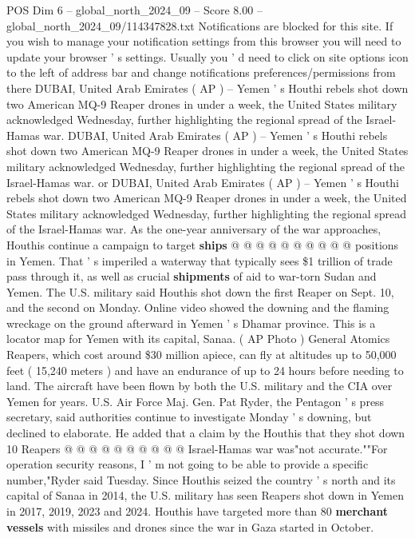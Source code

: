\begin{textsample}{POS Dim 6 – global\_north\_2024\_09 – Score 8.00 – global\_north\_2024\_09/114347828.txt}  \label{ex:f6_pos_362}
Notifications are blocked for this site.
If you wish to manage your notification settings from this browser you will need to update your browser ' s settings.
Usually you ' d need to click on site options icon to the left of address bar and change notifications preferences/permissions from there DUBAI, United Arab Emirates ( AP ) -- Yemen ' s Houthi rebels shot down two American MQ-9 Reaper drones in under a week, the United States military acknowledged Wednesday, further highlighting the regional spread of the Israel-Hamas war.
DUBAI, United Arab Emirates ( AP ) -- Yemen ' s Houthi rebels shot down two American MQ-9 Reaper drones in under a week, the United States military acknowledged Wednesday, further highlighting the regional spread of the Israel-Hamas war. or DUBAI, United Arab Emirates ( AP ) -- Yemen ' s Houthi rebels shot down two American MQ-9 Reaper drones in under a week, the United States military acknowledged Wednesday, further highlighting the regional spread of the Israel-Hamas war.
As the one-year anniversary of the war approaches, Houthis continue a campaign to target \textbf{ships} @ @ @ @ @ @ @ @ @ @ positions in Yemen.
That ' s imperiled a waterway that typically sees \$1 trillion of trade pass through it, as well as crucial \textbf{shipments} of aid to war-torn Sudan and Yemen.
The U.S. military said Houthis shot down the first Reaper on Sept. 10, and the second on Monday.
Online video showed the downing and the flaming wreckage on the ground afterward in Yemen ' s Dhamar province.
This is a locator map for Yemen with its capital, Sanaa. ( AP Photo ) General Atomics Reapers, which cost around \$30 million apiece, can fly at altitudes up to 50,000 feet ( 15,240 meters ) and have an endurance of up to 24 hours before needing to land.
The aircraft have been flown by both the U.S. military and the CIA over Yemen for years.
U.S.
Air Force Maj.
Gen.
Pat Ryder, the Pentagon ' s press secretary, said authorities continue to investigate Monday ' s downing, but declined to elaborate.
He added that a claim by the Houthis that they shot down 10 Reapers @ @ @ @ @ @ @ @ @ @ Israel-Hamas war was"not accurate.""For operation security reasons, I ' m not going to be able to provide a specific number,"Ryder said Tuesday.
Since Houthis seized the country ' s north and its capital of Sanaa in 2014, the U.S. military has seen Reapers shot down in Yemen in 2017, 2019, 2023 and 2024.
Houthis have targeted more than 80 \textbf{merchant} \textbf{vessels} with missiles and drones since the war in Gaza started in October.

\end{textsample}
